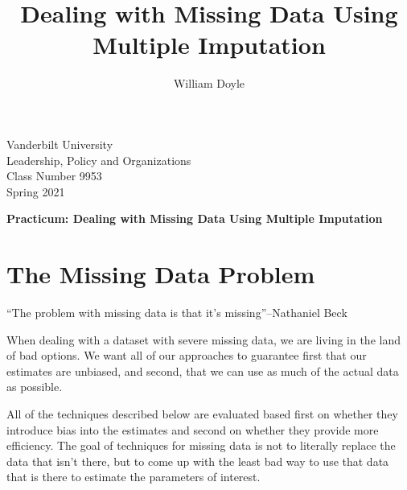 \documentclass[12 pt]{article}
\title{Dealing with Missing Data Using Multiple Imputation}
\author{William Doyle}
\begin{document}
\thispagestyle{empty}%

\setlength{\parskip}{1ex plus 0.5ex minus 0.2ex}

\setcounter{secnumdepth}{-2}


\begin{flushleft}
  Vanderbilt University\\Leadership, Policy and Organizations\\Class Number 9953\\ Spring 2021\\
\end{flushleft}

\begin{center}
\textbf{Practicum: Dealing with Missing Data Using Multiple Imputation}
\end{center}

\section{The Missing Data Problem}
\label{sec:misss-data-probl}

``The problem with missing data is that it's missing''--Nathaniel Beck

When dealing with a dataset with severe missing data, we are living in
the land of bad options. We want all of our approaches to guarantee
first that our estimates are unbiased, and second, that we can use as
much of the actual data as possible. 

All of the techniques described below are evaluated based first on
whether they introduce bias into the estimates and second on whether
they provide more efficiency.  The goal of techniques for missing data
is not to literally replace the data that isn't there, but to come up
with the least bad way to use that data that is there to estimate the
parameters of interest.
\end{document}
